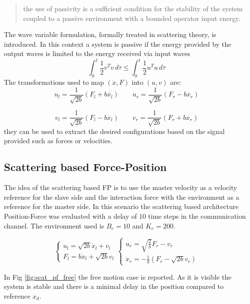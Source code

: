 \documentclass[a4paper,12pt]{article}
\begin{document}
\begin{quote}
    the use of passivity is a sufficient condition for the stability of the system coupled to a passive environment with a bounded operator input energy.
\end{quote}

\noindent The wave variable formulation, formally treated in scattering theory, is introduced. In this context a system is passive if the energy provided by the output waves is limited to the energy received via input waves
\[
    \int_{0}^{t} \frac{1}{2}v^Tv \,d\tau \leq \int_{0}^{t} \frac{1}{2}u^Tu \,d\tau 
\]
The transformations used to map $(\dot{x},F)$ into $(u,v)$ are:
\[
    u_l = \frac{1}{\sqrt{2b}}(F_l + b \dot{x_l}) \qquad u_r = \frac{1}{\sqrt{2b}}(F_r - b \dot{x_r}) 
\]

\[
    v_l = \frac{1}{\sqrt{2b}}(F_l - b \dot{x_l}) \qquad v_r = \frac{1}{\sqrt{2b}}(F_r + b \dot{x_r}) 
\]
they can be used to extract the desired configurations based on the signal provided such as forces or velocities.

\newpage
\subsection{Scattering based Force-Position}

The idea of the scattering based FP is to use the master velocity as a velocity reference for the slave side and the interaction force with the environment as a reference for the master side. In this scenario the scattering based architecture Position-Force was evaluated with a delay of 10 time steps in the communication channel. The environment used is $B_e = 10$ and $K_e = 200$. 

\[
    \begin{cases}
    u_l=\sqrt{2b}\dot{x}_l+v_l\\
    F_l=b\dot{x}_l+\sqrt{2b}v_l
    \end{cases}
    \begin{cases}
    u_r=\sqrt{\frac{2}{b}}F_r-v_r\\
    \dot{x}_r=-\frac{1}{b}(F_r-\sqrt{2b}v_r)
    \end{cases}
\]

\bigskip
In Fig \ref{fig:scat_pf_free} the free motion case is reported. As it is visible the system is stable and there is a minimal delay in the position compared to reference $x_d$.
\end{document}
